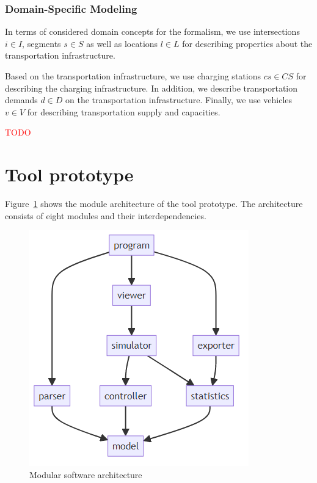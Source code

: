 \documentclass[10pt,twocolumn]{article}
\begin{document}
\subsubsection{Domain-Specific Modeling}
\label{sec:domain-specific-modeling}


In terms of considered domain concepts for the formalism, we use intersections $i \in I$, segments $s \in S$ as well as locations $l \in L$ for describing properties about the transportation infrastructure.

Based on the transportation infrastructure, we use charging stations $cs \in CS$ for describing the charging infrastructure. In addition, we describe transportation demands $d \in D$ on the transportation infrastructure. 
Finally, we use vehicles $v \in V$ for describing transportation supply and capacities.

\textcolor{red}{TODO}

\section{Tool prototype}
\label{sec:tool-prototype}

Figure~\ref{fig:software-architecture} shows the module architecture of the tool prototype.
The architecture consists of eight modules and their interdependencies.

\begin{figure}[h!]
    \centering
    \includegraphics[scale=0.4]{../../diagrams/architecture-v2.png}
    \caption{Modular software architecture}
    \label{fig:software-architecture}
\end{figure}
\end{document}
